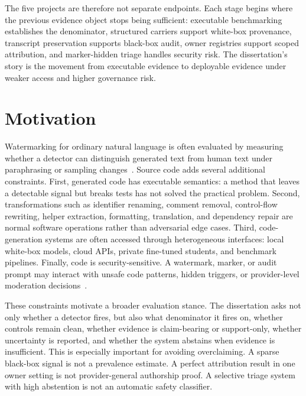 
The five projects are therefore not separate endpoints. Each stage begins where the previous evidence object stops being sufficient: executable benchmarking establishes the denominator, structured carriers support white-box provenance, transcript preservation supports black-box audit, owner registries support scoped attribution, and marker-hidden triage handles security risk. The dissertation's story is the movement from executable evidence to deployable evidence under weaker access and higher governance risk.

\section{Motivation}

Watermarking for ordinary natural language is often evaluated by measuring whether a detector can distinguish generated text from human text under paraphrasing or sampling changes~\cite{kirchenbauer2023watermark,zhao2024provable}. Source code adds several additional constraints. First, generated code has executable semantics: a method that leaves a detectable signal but breaks tests has not solved the practical problem. Second, transformations such as identifier renaming, comment removal, control-flow rewriting, helper extraction, formatting, translation, and dependency repair are normal software operations rather than adversarial edge cases. Third, code-generation systems are often accessed through heterogeneous interfaces: local white-box models, cloud APIs, private fine-tuned students, and benchmark pipelines. Finally, code is security-sensitive. A watermark, marker, or audit prompt may interact with unsafe code patterns, hidden triggers, or provider-level moderation decisions~\cite{pearce2022asleep,perry2023users,siddiq2023llmseceval}.

These constraints motivate a broader evaluation stance. The dissertation asks not only whether a detector fires, but also what denominator it fires on, whether controls remain clean, whether evidence is claim-bearing or support-only, whether uncertainty is reported, and whether the system abstains when evidence is insufficient. This is especially important for avoiding overclaiming. A sparse black-box signal is not a prevalence estimate. A perfect attribution result in one owner setting is not provider-general authorship proof. A selective triage system with high abstention is not an automatic safety classifier.

